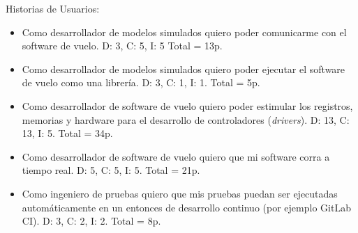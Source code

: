 Historias de Usuarios:

\begin{itemize}
\item Como desarrollador de modelos simulados quiero poder comunicarme con el software de vuelo. D: 3, C: 5, I: 5 Total = 13p.

\item Como desarrollador de modelos simulados quiero poder ejecutar el software de vuelo como una librería. D: 3, C: 1, I: 1. Total = 5p.

\item Como desarrollador de software de vuelo quiero poder estimular los registros, memorias y hardware para el desarrollo de controladores (\textit{drivers}). D: 13, C: 13, I: 5. Total = 34p.

\item Como desarrollador de software de vuelo quiero que mi software corra a tiempo real. D: 5, C: 5, I: 5. Total = 21p.

\item Como ingeniero de pruebas quiero que mis pruebas puedan ser ejecutadas automáticamente en un entonces de desarrollo continuo (por ejemplo GitLab CI). D: 3, C: 2, I: 2. Total = 8p.
\end{itemize}
